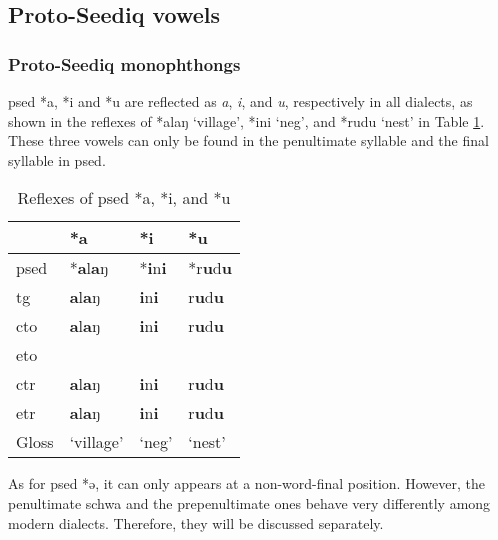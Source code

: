 \subsection{Proto-Seediq vowels} \label{sec:psedV}

\subsubsection{Proto-Seediq monophthongs}

\acl{psed} *a, *i and *u are reflected as \textit{a}, \textit{i}, and \textit{u}, respectively in all dialects, as shown in the reflexes of *alaŋ `village', *ini `\acs{neg}', and *rudu `nest' in Table \ref{tab:psed_aiu}. These three vowels can only be found in the penultimate syllable and the final syllable in \acl{psed}.  

\begin{table}[!htbp]
\centering
\caption{Reflexes of \acl{psed} *a, *i, and *u}
\label{tab:psed_aiu}
\begin{tabular}{llll}
\hline
           & *a        & *i          & *u     \\ \hline
\acs{psed} & *\textbf{a}l\textbf{a}ŋ     & *\textbf{i}n\textbf{i}        & *r\textbf{u}d\textbf{u}  \\ \hdashline
\acs{tg}   & \textbf{a}l\textbf{a}ŋ      & \textbf{i}n\textbf{i}         & r\textbf{u}d\textbf{u}   \\
\acs{cto}  & \textbf{a}l\textbf{a}ŋ      & \textbf{i}n\textbf{i}         & r\textbf{u}d\textbf{u}   \\
\acs{eto}  &           &             &        \\
\acs{ctr}  & \textbf{a}l\textbf{a}ŋ      & \textbf{i}n\textbf{i}         & r\textbf{u}d\textbf{u}   \\
\acs{etr}  & \textbf{a}l\textbf{a}ŋ      & \textbf{i}n\textbf{i}         & r\textbf{u}d\textbf{u}   \\ \hline
Gloss      & `village' & `\acs{neg}' & `nest' \\ \hline
\end{tabular}
\end{table}

As for \acl{psed} *ə, it can only appears at a non-word-final position. However, the penultimate schwa and the prepenultimate ones behave very differently among modern dialects. Therefore, they will be discussed separately. 

